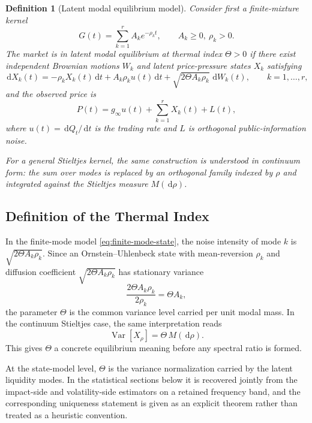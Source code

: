 \documentclass[11pt]{article}
\newtheorem{definition}[theorem]{Definition}
\newcommand{\dd}{\,\mathrm{d}}
\newcommand{\REV}{}
\begin{document}
\begin{definition}[Latent modal equilibrium model]\label{def:modal-equilibrium}
Consider first a finite-mixture kernel
\[
  G(t)=\sum_{k=1}^r A_k e^{-\rho_k t},
  \qquad A_k\ge 0,\ \rho_k>0.
\]
The market is in latent modal equilibrium at thermal index $\Theta>0$ if there exist independent Brownian motions $W_k$ and latent price-pressure states $X_k$ satisfying
\begin{equation}\label{eq:finite-mode-state}
  \dd X_k(t)=-\rho_k X_k(t)\dd t + A_k\rho_k u(t)\dd t + \sqrt{2\Theta A_k\rho_k}\,\dd W_k(t),
  \qquad k=1,\dots,r,
\end{equation}
and the observed price is
\begin{equation}\label{eq:finite-mode-price}
  P(t)=g_\infty u(t)+\sum_{k=1}^r X_k(t)+L(t),
\end{equation}
where $u(t)=\dd Q_t/\dd t$ is the trading rate and $L$ is orthogonal public-information noise.

For a general Stieltjes kernel, the same construction is understood in continuum form: the sum over modes is replaced by an orthogonal family indexed by $\rho$ and integrated against the Stieltjes measure $M(\dd\rho)$.
\end{definition}

\subsection{Definition of the Thermal Index}
\REV
In the finite-mode model \cref{eq:finite-mode-state}, the noise intensity of mode $k$ is $\sqrt{2\Theta A_k\rho_k}$. Since an Ornstein--Uhlenbeck state with mean-reversion $\rho_k$ and diffusion coefficient $\sqrt{2\Theta A_k\rho_k}$ has stationary variance
\[
  \frac{2\Theta A_k\rho_k}{2\rho_k}=\Theta A_k,
\]
the parameter $\Theta$ is the common variance level carried per unit modal mass. In the continuum Stieltjes case, the same interpretation reads
\[
  \operatorname{Var}[X_\rho]=\Theta\,M(\dd\rho).
\]
This gives $\Theta$ a concrete equilibrium meaning before any spectral ratio is formed.

At the state-model level, $\Theta$ is the variance normalization carried by the latent liquidity modes. In the statistical sections below it is recovered jointly from the impact-side and volatility-side estimators on a retained frequency band, and the corresponding uniqueness statement is given as an explicit theorem rather than treated as a heuristic convention.
\end{document}
